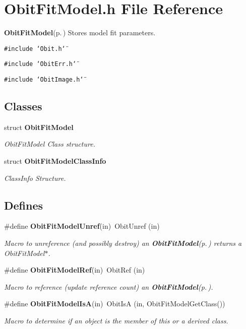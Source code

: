 \section{Obit\-Fit\-Model.h File Reference}
\label{ObitFitModel_8h}
{\bf Obit\-Fit\-Model}{\rm (p.\,\pageref{structObitFitModel})} Stores model fit parameters. 

{\tt \#include \char`\"{}Obit.h\char`\"{}}\par
{\tt \#include \char`\"{}Obit\-Err.h\char`\"{}}\par
{\tt \#include \char`\"{}Obit\-Image.h\char`\"{}}\par
\subsection*{Classes}
\begin{CompactItemize}
\item 
struct {\bf Obit\-Fit\-Model}
\begin{CompactList}\small\item\em Obit\-Fit\-Model Class structure. \item\end{CompactList}\item 
struct {\bf Obit\-Fit\-Model\-Class\-Info}
\begin{CompactList}\small\item\em Class\-Info Structure. \item\end{CompactList}\end{CompactItemize}
\subsection*{Defines}
\begin{CompactItemize}
\item 
\#define {\bf Obit\-Fit\-Model\-Unref}(in)\ Obit\-Unref (in)
\begin{CompactList}\small\item\em Macro to unreference (and possibly destroy) an {\bf Obit\-Fit\-Model}{\rm (p.\,\pageref{structObitFitModel})} returns a Obit\-Fit\-Model$\ast$. \item\end{CompactList}\item 
\#define {\bf Obit\-Fit\-Model\-Ref}(in)\ Obit\-Ref (in)
\begin{CompactList}\small\item\em Macro to reference (update reference count) an {\bf Obit\-Fit\-Model}{\rm (p.\,\pageref{structObitFitModel})}. \item\end{CompactList}\item 
\#define {\bf Obit\-Fit\-Model\-Is\-A}(in)\ Obit\-Is\-A (in, Obit\-Fit\-Model\-Get\-Class())
\begin{CompactList}\small\item\em Macro to determine if an object is the member of this or a derived class. \item\end{CompactList}\end{CompactItemize}
